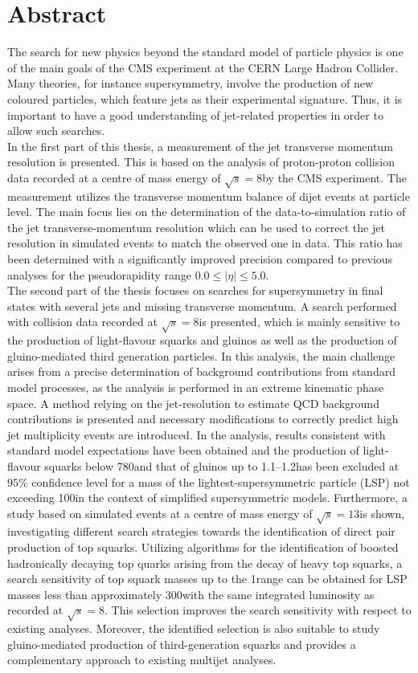 \section*{Abstract}
The search for new physics beyond the standard model of particle physics is one of the main goals of the CMS experiment at the CERN Large Hadron Collider. Many theories, for instance supersymmetry, involve the production of new coloured particles, which feature jets as their experimental signature. Thus, it is important to have a good understanding of jet-related properties in order to allow such searches.\\
In the first part of this thesis, a measurement of the jet transverse momentum resolution is presented. This is based on the analysis of proton-proton collision data recorded at a centre of mass energy of $\sqrt{s}=8$\tev by the CMS experiment. The measurement utilizes the transverse momentum balance of dijet events at particle level. The main focus lies on the determination of the data-to-simulation ratio of the jet transverse-momentum resolution which can be used to correct the jet resolution in simulated events to match the observed one in data. This ratio has been determined with a significantly improved precision compared to previous analyses for the pseudorapidity range $0.0 \leq |\eta| \leq 5.0$. \\ 
The second part of the thesis focuses on searches for supersymmetry in final states with several jets and missing transverse momentum. A search performed with collision data recorded at $\sqrt{s}=8$\tev is presented, which is mainly sensitive to the production of light-flavour squarks and gluinos as well as the production of gluino-mediated third generation particles. In this analysis, the main challenge arises from a precise determination of background contributions from standard model processes, as the analysis is performed in an extreme kinematic phase space. A method relying on the jet-\pt resolution to estimate QCD background contributions is presented and necessary modifications to correctly predict high jet multiplicity events are introduced. In the analysis, results consistent with standard model expectations have been obtained and the production of light-flavour squarks below 780\gev and that of gluinos up to 1.1--1.2\tev has been excluded at $95\%$ confidence level for a mass of the lightest-supersymmetric particle (LSP) not exceeding 100\gev in the context of simplified supersymmetric models. Furthermore, a study based on simulated events at a centre of mass energy of  $\sqrt{s}=13$\tev is shown, investigating different search strategies towards the identification of direct pair production of top squarks. Utilizing algorithms for the identification of boosted hadronically decaying top quarks arising from the decay of heavy top squarks, a search sensitivity of top squark masses up to the 1\tev range can be obtained for LSP masses less than approximately 300\gev with the same integrated luminosity as recorded at $\sqrt{s}=8$\tev. This selection improves the search sensitivity with respect to existing analyses. Moreover, the identified selection is also suitable to study gluino-mediated production of third-generation squarks and provides a complementary approach to existing multijet analyses.      
